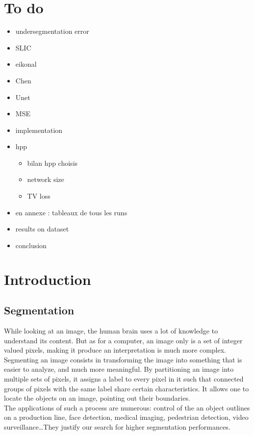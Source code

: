 \documentclass{article}
\begin{document}
\section*{To do}
\begin{itemize}
    \item undersegmentation error
    \item SLIC
    \item eikonal
    \item Chen
    \item Unet
    \item MSE
    \item implementation
    \item hpp
    \begin{itemize}
        \item bilan hpp choisis
        \item network size
        \item TV loss
    \end{itemize}
    \item en annexe : tableaux de tous les runs
    \item results on dataset
    \item conclusion
\end{itemize}

\section{Introduction}

    \subsection{Segmentation}
        While looking at an image, the human brain uses a lot of knowledge to understand its content. But as for a computer, an image only is a set of integer valued pixels, making it produce an interpretation is much more complex. Segmenting an image consists in transforming the image into something that is easier to analyze, and much more meaningful. By partitioning an image into multiple sets of pixels, it assigns a label to every pixel in it such that connected groups of pixels with the same label share certain characteristics. It allows one to locate the objects on an image, pointing out their boundaries.\\
        The applications of such a process are numerous: control of the an object outlines on a production line, face detection, medical imaging, pedestrian detection, video surveillance\ldots They justify our search for higher segmentation performances.
\end{document}
